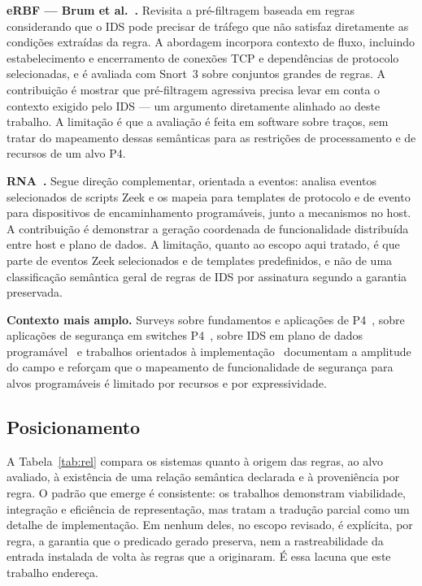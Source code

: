 \documentclass[11pt,a4paper]{article}
\begin{document}
\textbf{eRBF --- Brum et al.~\cite{brum2025rethinking}.} Revisita a
pré-filtragem baseada em regras considerando que o IDS pode precisar de
tráfego que não satisfaz diretamente as condições extraídas da regra. A
abordagem incorpora contexto de fluxo, incluindo estabelecimento e
encerramento de conexões TCP e dependências de protocolo selecionadas, e é
avaliada com Snort~3 sobre conjuntos grandes de regras. A contribuição é
mostrar que pré-filtragem agressiva precisa levar em conta o contexto exigido
pelo IDS --- um argumento diretamente alinhado ao deste trabalho. A limitação
é que a avaliação é feita em software sobre traços, sem tratar do mapeamento
dessas semânticas para as restrições de processamento e de recursos de um
alvo P4.

\textbf{RNA~\cite{hagen2025rna}.} Segue direção complementar, orientada a
eventos: analisa eventos selecionados de scripts Zeek e os mapeia para
templates de protocolo e de evento para dispositivos de encaminhamento
programáveis, junto a mecanismos no host. A contribuição é demonstrar a
geração coordenada de funcionalidade distribuída entre host e plano de dados.
A limitação, quanto ao escopo aqui tratado, é que parte de eventos Zeek
selecionados e de templates predefinidos, e não de uma classificação semântica
geral de regras de IDS por assinatura segundo a garantia preservada.

\textbf{Contexto mais amplo.} Surveys sobre fundamentos e aplicações de
P4~\cite{hauser2023p4survey}, sobre aplicações de segurança em switches
P4~\cite{alsabeh2022p4securitysurvey}, sobre IDS em plano de dados
programável~\cite{fida2026pdpids} e trabalhos orientados à
implementação~\cite{mazloum2025p4security} documentam a amplitude do campo e
reforçam que o mapeamento de funcionalidade de segurança para alvos
programáveis é limitado por recursos e por expressividade.

\subsection{Posicionamento}

A Tabela~\ref{tab:rel} compara os sistemas quanto à origem das regras, ao alvo
avaliado, à existência de uma relação semântica declarada e à proveniência por
regra. O padrão que emerge é consistente: os trabalhos demonstram viabilidade,
integração e eficiência de representação, mas tratam a tradução parcial como
um detalhe de implementação. Em nenhum deles, no escopo revisado, é explícita,
por regra, a garantia que o predicado gerado preserva, nem a rastreabilidade
da entrada instalada de volta às regras que a originaram. É essa lacuna que
este trabalho endereça.
\end{document}
